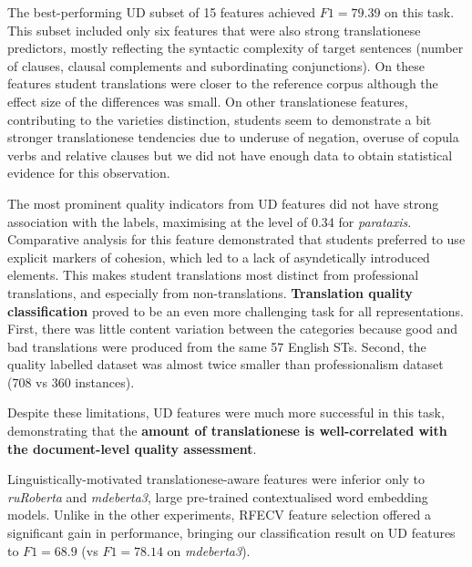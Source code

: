 The best-performing UD subset of 15 features achieved $F1=79.39$ on this task. This subset included only six features that were also strong translationese predictors, mostly reflecting the syntactic complexity of target sentences (number of clauses, clausal complements and subordinating conjunctions). On these features student translations were closer to the reference corpus although the effect size of the differences was small. On other translationese features, contributing to the varieties distinction, students seem to demonstrate a bit stronger translationese tendencies due to underuse of negation, overuse of copula verbs and relative clauses but we did not have enough data to obtain statistical evidence for this observation. 

The most prominent quality indicators from UD features did not have strong association with the labels, maximising at the level of 0.34 for \textit{parataxis}. Comparative analysis for this feature demonstrated that students preferred to use explicit markers of cohesion, which led to a lack of asyndetically introduced elements. This makes student translations most distinct from professional translations, and especially from non-translations.
\textbf{Translation quality classification} proved to be an even more challenging task for all representations. First, there was little content variation between the categories because good and bad translations were produced from the same 57 English STs. Second, the quality labelled dataset was almost twice smaller than professionalism dataset (708 vs 360 instances). %

Despite these limitations, UD features were much more successful in this task, demonstrating that the \textbf{amount of translationese is well-correlated with the document-level quality assessment}. 

\label{pg:translationese_indicators_work_for_binary_labels}
Linguistically-motivated translationese-aware features were inferior only to \textit{ruRoberta} and \textit{mdeberta3}, large pre-trained contextualised word embedding models. Unlike in the other experiments, RFECV feature selection offered a significant gain in performance, bringing our classification result on UD features to $F1=68.9$ (vs $F1=78.14$ on \textit{mdeberta3}).

